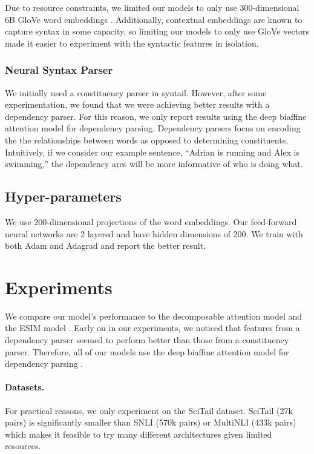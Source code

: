 \documentclass[11pt,a4paper]{article}
\begin{document}
Due to resource constraints, we limited our models to only use 300-dimensional
6B GloVe word embeddings \citep{pennington2014glove}.  Additionally, contextual
embeddings are known to capture syntax in some capacity, so limiting our models
to only use GloVe vectors made it easier to experiment with the syntactic
features in isolation.

\subsubsection{Neural Syntax Parser}

We initially used a constituency parser in syntail. However, after some
experimentation, we found that we were achieving better results with a
dependency parser.  For this reason, we only report results using the deep
biaffine attention model for dependency parsing.  Dependency parsers focus on
encoding the the relationships between words as opposed to determining
constituents.  Intuitively, if we consider our example sentence, ``Adrian is
running and Alex is swimming,'' the dependency arcs will be more informative of
who is doing what.

\subsection{Hyper-parameters}

We use 200-dimensional projections of the word embeddings. Our feed-forward
neural networks are 2 layered and have hidden dimensions of 200. We train with
both Adam \citep{kingma2014adam} and Adagrad \citep{duchi2011adaptive} and
report the better result.

\section{Experiments}

We compare our model's performance to the decomposable attention model
\citep{parikh2016decomposable} and the ESIM model \citep{chen2016enhanced}.
Early on in our experiments, we noticed that features from a dependency parser
seemed to perform better than those from a constituency parser.  Therefore, all
of our models use the deep biaffine attention model for dependency parsing
\citep{dozat2016deep}.

\paragraph{Datasets.} For practical reasons, we only experiment on the SciTail
dataset. SciTail (27k pairs) is significantly smaller than SNLI (570k pairs)
\citep{bowman2015large} or MultiNLI (433k pairs) \citep{williams2017broad}
which makes it feasible to try many different architectures given limited
resources.
\end{document}
